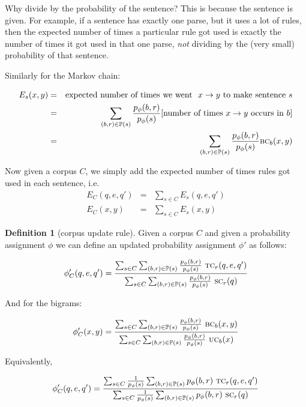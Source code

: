 \documentclass[12pt]{article}
\theoremstyle{definition}
\newtheorem{definition}{Definition}[section]
\begin{document}
Why divide by the probability of the sentence? This is because the sentence is given. For example, if a sentence has exactly one parse, but it uses a lot of rules, then the expected number of times a particular rule got used is exactly the number of times it got used in that one parse, \emph{not} dividing by the (very small) probability of that sentence.

Similarly for the Markov chain:

\begin{eqnarray*}
  E_s(x,y) & = & \textrm{expected number of times we went }~x\rightarrow y~\textrm{to make sentence}~s \\
  & = & \sum_{(b,r)\in\mathbb{P}(s)}\frac{p_\phi(b,r)}{p_\phi(s)}[\textrm{number of times}~x\rightarrow y\textrm{ occurs in }b ] \\
  & = & \sum_{(b,r)\in\mathbb{P}(s)}\frac{p_\phi(b,r)}{p_\phi(s)}\text{\textsc{bc}}_b(x,y)
  \end{eqnarray*}



Now given a corpus $C$, we simply add the expected number of times rules got used in each sentence, i.e.
\begin{eqnarray*}
  E_C(q,e,q')& = &\sum_{s\in C}E_s(q,e,q')\\
  E_C(x,y)& = &\sum_{s\in C}E_s(x,y)
\end{eqnarray*}



\begin{definition}[corpus update rule]
  Given a corpus $C$ and given a probability assignment $\phi$ we can define an updated probability assignment $\phi'$ as follows:

  $$\phi_C'(q,e,q') = \frac{\sum_{s\in C}\sum_{(b,r)\in\mathbb{P}(s)} \frac{p_\phi(b,r)}{p_\phi(s)}~ \text{\textsc{tc}}_r(q,e,q')}{\sum_{s\in C}\sum_{(b,r)\in\mathbb{P}(s)} \frac{p_\phi(b,r)}{p_\phi(s)}~ \text{\textsc{sc}}_r(q)}$$ 

And for the bigrams:

  $$\phi_C'(x,y) = \frac{\sum_{s\in C}\sum_{(b,r)\in\mathbb{P}(s)} \frac{p_\phi(b,r)}{p_\phi(s)}~ \text{\textsc{bc}}_b(x,y)}{\sum_{s\in C}\sum_{(b,r)\in\mathbb{P}(s)} \frac{p_\phi(b,r)}{p_\phi(s)}~ \text{\textsc{uc}}_b(x)}$$ 

\end{definition}


Equivalently,

$$\phi_C'(q,e,q') = \frac{\sum_{s\in C}\frac{1}{p_\phi(s)}\sum_{(b,r)\in\mathbb{P}(s)} p_\phi(b,r)~ \text{\textsc{tc}}_r(q,e,q')}{\sum_{s\in C}\frac{1}{p_\phi(s)}\sum_{(b,r)\in\mathbb{P}(s)} p_\phi(b,r)~ \text{\textsc{sc}}_r(q)}$$ 
\end{document}
